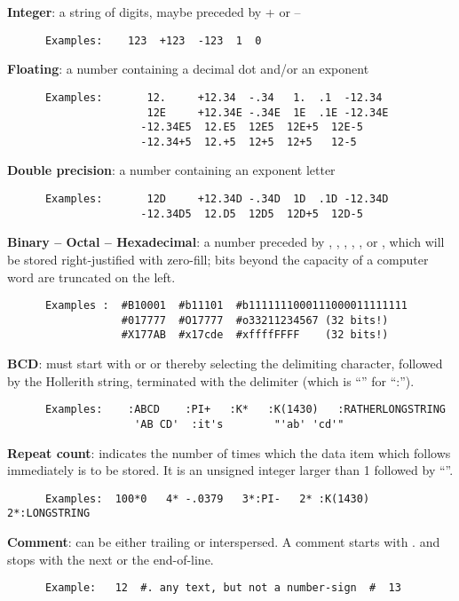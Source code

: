 \textbf{Integer}:  a string of digits, maybe preceded by + or --
\begin{verbatim}
      Examples:    123  +123  -123  1  0
\end{verbatim}
\textbf{Floating}: a number containing a decimal dot and/or an exponent
\begin{verbatim}
      Examples:       12.     +12.34  -.34   1.  .1  -12.34
                      12E     +12.34E -.34E  1E  .1E -12.34E
                     -12.34E5  12.E5  12E5  12E+5  12E-5
                     -12.34+5  12.+5  12+5  12+5   12-5
\end{verbatim}
\textbf{Double precision}: a number containing an exponent letter 
\begin{verbatim}
      Examples:       12D     +12.34D -.34D  1D  .1D -12.34D
                     -12.34D5  12.D5  12D5  12D+5  12D-5
\end{verbatim} 
\textbf{Binary -- Octal -- Hexadecimal}:  a number preceded
by , , , , ,  or ,
which will be stored right-justified with zero-fill;
bits beyond the capacity of a computer word are truncated on the left.
\begin{verbatim}
      Examples :  #B10001  #b11101  #b1111111000111000011111111
                  #017777  #O17777  #o33211234567 (32 bits!)
                  #X177AB  #x17cde  #xffffFFFF    (32 bits!)
\end{verbatim} 
\textbf{BCD}:  must start with   or  or \Lit{:} thereby
selecting the delimiting character, followed by the Hollerith string,
terminated with the delimiter (which is ``'' for ``:'').
\begin{verbatim}
      Examples:    :ABCD    :PI+   :K*   :K(1430)   :RATHERLONGSTRING
                    'AB CD'  :it's        "'ab' 'cd'"
\end{verbatim} 
\textbf{Repeat count}:  indicates the number of times which the data item which
follows immediately is to be stored.
It is an unsigned integer larger than 1 followed by ``\Lit{*}''.
\begin{verbatim}
      Examples:  100*0   4* -.0379   3*:PI-   2* :K(1430)  2*:LONGSTRING
\end{verbatim} 
\textbf{Comment}:    can be either trailing or interspersed.
A comment starts with  \Lit{#}.  and stops with the next  \Lit{#}  or the end-of-line.
\begin{verbatim}
      Example:   12  #. any text, but not a number-sign  #  13
\end{verbatim} 

